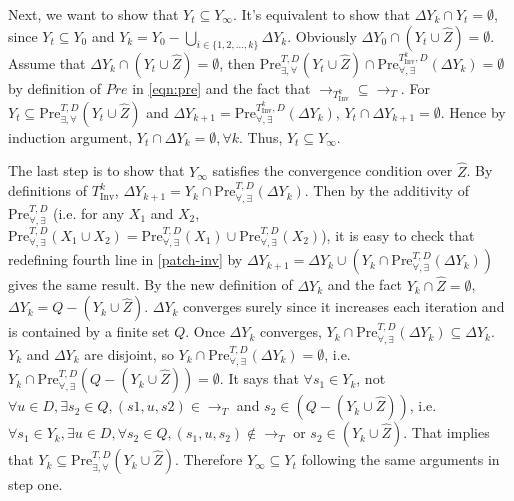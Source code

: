 	Next, we want to show that $ Y_t \subseteq Y_{\infty} $. It's equivalent to show that $ \Delta Y_k\cap Y_t = \emptyset $, since $ Y_t\subseteq Y_0 $ and $ Y_k = Y_0 - \bigcup_{i\in \{1,2,...,k\}} \Delta Y_k$. Obviously $ \Delta Y_0\cap (Y_t\cup \widehat{Z}) = \emptyset $. Assume that $ \Delta Y_k \cap (Y_t\cup \widehat{Z}) = \emptyset $, then $ \text{Pre}_{\exists,\forall}^{T,D} (Y_t\cup \widehat{Z}) \cap \text{Pre}_{\forall, \exists}^{T_{\text{Inv}}^k,D}(\Delta Y_k) = \emptyset$ by definition of $ Pre $ in \eqref{eqn:pre} and the fact that $ \rightarrow_{T_{\text{Inv}}^k}\subseteq \rightarrow_{T} $. For $ Y_t \subseteq \text{Pre}_{\exists,\forall}^{T,D} (Y_t\cup \widehat{Z}) $ and $ \Delta Y_{k+1} = \text{Pre}_{\forall, \exists}^{T_{\text{Inv}}^k,D}(\Delta Y_k) $, $ Y_t\cap \Delta Y_{k+1} = \emptyset $. Hence by induction argument, $ Y_t \cap \Delta Y_k = \emptyset, \forall k $. Thus, $ Y_t\subseteq Y_{\infty} $. 
	
	The last step is to show that $ Y_{\infty} $ satisfies the convergence condition over $ \widehat{Z} $. By definitions of $ T_{\text{Inv}}^k $, $ \Delta Y_{k+1}= Y_k \cap \text{Pre}_{\forall,\exists}^{T, D}(\Delta Y_k)$. Then by the additivity of $ \text{Pre}^{T,D}_{\forall,\exists} $ (i.e. for any $ X_1 $ and $ X_2 $, $ \text{Pre}_{\forall,\exists}^{T,D} (X_1\cup X_2)=\text{Pre}_{\forall,\exists}^{T,D} (X_1)\cup \text{Pre}_{\forall,\exists}^{T,D} (X_2) $), it is easy to check that redefining fourth line in \eqref{patch-inv} by $ \Delta Y_{k+1} = \Delta Y_k \cup (Y_k \cap \text{Pre}_{\forall,\exists}^{T, D}(\Delta Y_k)) $ gives the same result.  By the new definition of $ \Delta Y_k $ and the fact $ Y_k \cap \widehat{Z} = \emptyset $, $ \Delta Y_k = Q-(Y_k\cup \widehat{Z}) $. $ \Delta Y_k $ converges surely since it increases each iteration and is contained by a finite set $ Q $. Once $ \Delta Y_k $ converges, $ Y_k \cap \text{Pre}_{\forall,\exists}^{T, D}(\Delta Y_k)\subseteq \Delta Y_k $. $ Y_k $ and $ \Delta Y_k $ are disjoint, so $ Y_k \cap \text{Pre}_{\forall,\exists}^{T, D}(\Delta Y_k) = \emptyset $, i.e.  $ Y_k \cap \text{Pre}_{\forall,\exists}^{T, D}(Q-(Y_k\cup \widehat{Z})) = \emptyset $. It says that $ \forall s_1 \in Y_k$, not $\forall u\in D, \exists s_2\in Q, (s1,u,s2)\in \rightarrow_{T} $ and $s_2\in (Q-(Y_k\cup \widehat{Z}))$, i.e. $ \forall s_1 \in Y_k, \exists u\in D, \forall s_2 \in Q,  (s_1,u,s_2)\not\in \rightarrow_{T}$ or $ s_2\in (Y_k\cup \widehat{Z})$. That implies that $ Y_k\subseteq \text{Pre}_{\exists,\forall}^{T,D}(Y_k\cup \widehat{Z}) $. Therefore $ Y_{\infty}\subseteq Y_t $ following the same arguments in step one. \QEDB
\fi